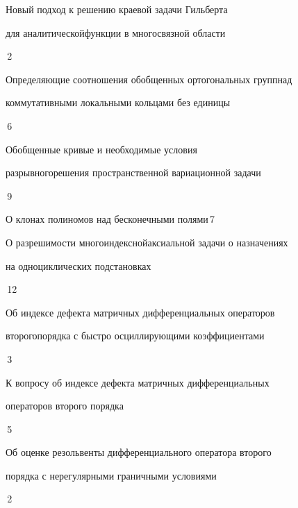 

{Новый подход к решению краевой задачи Гильберта  


для аналитической\newline функции в многосвязной области}{\No\,2}




{Определяющие соотношения обобщенных ортогональных групп\newline над 


коммутативными локальными кольцами без единицы}{\No\,6}




{Обобщенные кривые и необходимые условия  


разрывного\newline решения пространственной вариационной задачи}{\No\,9}




{О клонах полиномов над бесконечными полями}{\No\,7}




{О разрешимости многоиндексной\newline аксиальной задачи о назначениях


на одноциклических подстановках}{\No\,12}




{Об индексе дефекта матричных дифференциальных операторов 


второго\newline порядка с быстро осциллирующими коэффициентами}{\No\,3}




{К вопросу об индексе дефекта матричных дифференциальных 


\newline операторов второго порядка}{\No\,5}




{Об оценке резольвенты дифференциального оператора второго\newline


порядка с нерегулярными граничными условиями}{\No\,2}






